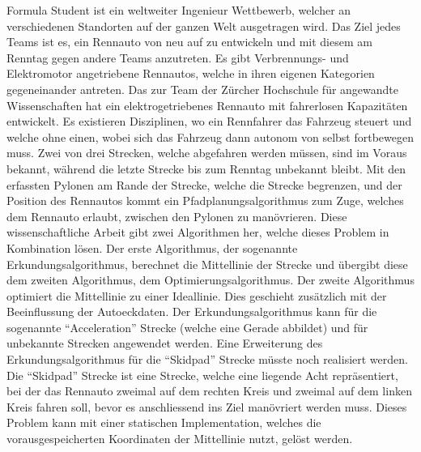 Formula Student ist ein weltweiter Ingenieur Wettbewerb, welcher an verschiedenen Standorten auf der ganzen Welt ausgetragen wird. Das Ziel jedes Teams ist es, ein Rennauto von neu auf zu entwickeln und mit diesem am Renntag gegen andere Teams anzutreten. Es gibt Verbrennungs- und Elektromotor angetriebene Rennautos, welche in ihren eigenen Kategorien gegeneinander antreten. Das \acrlong{zur} Team der Zürcher Hochschule für angewandte Wissenschaften hat ein elektrogetriebenes Rennauto mit fahrerlosen Kapazitäten entwickelt. Es existieren Disziplinen, wo ein Rennfahrer das Fahrzeug steuert und welche ohne einen, wobei sich das Fahrzeug dann autonom von selbst fortbewegen muss. Zwei von drei Strecken, welche abgefahren werden müssen, sind im Voraus bekannt, während die letzte Strecke bis zum Renntag unbekannt bleibt. Mit den erfassten Pylonen am Rande der Strecke, welche die Strecke begrenzen, und der Position des Rennautos kommt ein Pfadplanungsalgorithmus zum Zuge, welches dem Rennauto erlaubt, zwischen den Pylonen zu manövrieren. Diese wissenschaftliche Arbeit gibt zwei Algorithmen her, welche dieses Problem in Kombination lösen. Der erste Algorithmus, der sogenannte Erkundungsalgorithmus, berechnet die Mittellinie der Strecke und übergibt diese dem zweiten Algorithmus, dem Optimierungsalgorithmus. Der zweite Algorithmus optimiert die Mittellinie zu einer Ideallinie. Dies geschieht zusätzlich mit der Beeinflussung der Autoeckdaten. Der Erkundungsalgorithmus kann für die sogenannte ``Acceleration'' Strecke (welche eine Gerade abbildet) und für unbekannte Strecken angewendet werden. Eine Erweiterung des Erkundungsalgorithmus für die ``Skidpad'' Strecke müsste noch realisiert werden. Die ``Skidpad'' Strecke ist eine Strecke, welche eine liegende Acht repräsentiert, bei der das Rennauto zweimal auf dem rechten Kreis und zweimal auf dem linken Kreis fahren soll, bevor es anschliessend ins Ziel manövriert werden muss. Dieses Problem kann mit einer statischen Implementation, welches die vorausgespeicherten Koordinaten der Mittellinie nutzt, gelöst werden.
